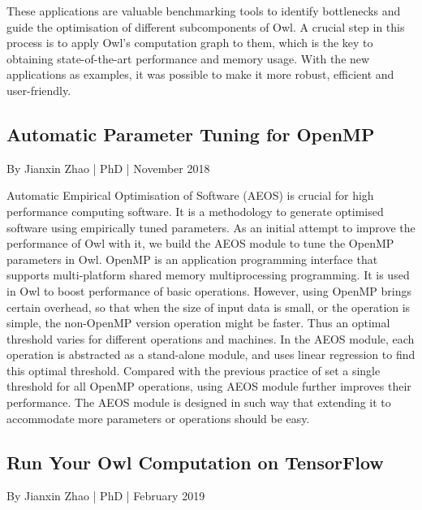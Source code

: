 These applications are valuable benchmarking tools to identify bottlenecks and guide the optimisation of different subcomponents of Owl. A crucial step in this process is to apply Owl's computation graph to them, which is the key to obtaining state-of-the-art performance and memory usage. With the new applications as examples, it was possible to make it more robust, efficient and user-friendly.


\hypertarget{Automatic Parameter Tuning for OpenMP}{%
\subsection{Automatic Parameter Tuning for OpenMP}\label{theses-aeos}}

By Jianxin Zhao | PhD | November 2018

Automatic Empirical Optimisation of Software (AEOS) is crucial for high performance computing software. It is a methodology to generate optimised software using empirically tuned parameters. As an initial attempt to improve the performance of Owl with it, we build the AEOS module to tune the OpenMP parameters in Owl. OpenMP is an application programming interface that supports multi-platform shared memory multiprocessing programming. It is used in Owl to boost performance of basic operations. However, using OpenMP brings certain overhead, so that when the size of input data is small, or the operation is simple, the non-OpenMP version operation might be faster. Thus an optimal threshold varies for different operations and machines. In the AEOS module, each operation is abstracted as a stand-alone module, and uses linear regression to find this optimal threshold. Compared with the previous practice of set a single threshold for all OpenMP operations, using AEOS module further improves their performance. The AEOS module is designed in such way that extending it to accommodate more parameters or operations should be easy.


\hypertarget{Run Your Owl Computation on TensorFlow}{%
\subsection{Run Your Owl Computation on TensorFlow}\label{theses-tf}}

By Jianxin Zhao | PhD | February 2019


